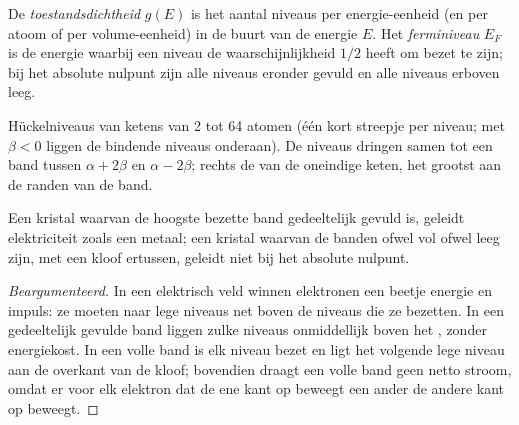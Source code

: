 \begin{definition}\label{def:b3:solid-state:fermi}
De \emph{toestandsdichtheid} $g(E)$ is het aantal
niveaus per energie-eenheid (en per atoom of per volume-eenheid) in de buurt van de energie $E$.
Het \emph{ferminiveau} $E_F$ is de energie waarbij een
niveau de waarschijnlijkheid $1/2$ heeft om bezet te zijn; bij het absolute nulpunt zijn alle niveaus eronder
gevuld en alle niveaus erboven leeg.
\end{definition}

\begin{omfigure}

{\small Hückelniveaus van ketens van 2 tot 64 atomen (één kort streepje
per niveau; met $\beta < 0$ liggen de bindende niveaus onderaan). De niveaus dringen samen tot een band
tussen $\alpha + 2\beta$ en $\alpha - 2\beta$; rechts de  van de oneindige
keten, het grootst aan de randen van de band.}
\end{omfigure}

\begin{proposition}[Bandvulling]\label{prop:b3:solid-state:filling}
Een kristal waarvan de hoogste bezette band gedeeltelijk gevuld is,
geleidt elektriciteit zoals een metaal; een kristal waarvan de banden
ofwel vol ofwel leeg zijn, met een kloof ertussen, geleidt niet bij het
absolute nulpunt.
\end{proposition}

\begin{proof}[Beargumenteerd]
In een elektrisch veld winnen elektronen een beetje energie en impuls:
ze moeten naar lege niveaus net boven de niveaus die ze bezetten. In een
gedeeltelijk gevulde band liggen zulke niveaus onmiddellijk boven het
, zonder energiekost. In een volle band is elk niveau bezet en
ligt het volgende lege niveau aan de overkant van de kloof; bovendien
draagt een volle band geen netto stroom, omdat er voor elk elektron dat
de ene kant op beweegt een ander de andere kant op beweegt.
\end{proof}

